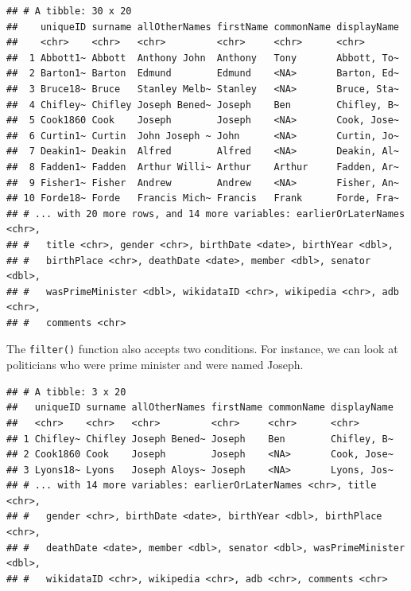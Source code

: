 \documentclass[
]{book}
\newenvironment{Shaded}{\begin{snugshade}}{\end{snugshade}}
\newcommand{\DecValTok}[1]{\textcolor[rgb]{0.00,0.00,0.81}{#1}}
\newcommand{\KeywordTok}[1]{\textcolor[rgb]{0.13,0.29,0.53}{\textbf{#1}}}
\newcommand{\NormalTok}[1]{#1}
\newcommand{\OperatorTok}[1]{\textcolor[rgb]{0.81,0.36,0.00}{\textbf{#1}}}
\newcommand{\StringTok}[1]{\textcolor[rgb]{0.31,0.60,0.02}{#1}}
\begin{document}
\begin{verbatim}
## # A tibble: 30 x 20
##    uniqueID surname allOtherNames firstName commonName displayName
##    <chr>    <chr>   <chr>         <chr>     <chr>      <chr>      
##  1 Abbott1~ Abbott  Anthony John  Anthony   Tony       Abbott, To~
##  2 Barton1~ Barton  Edmund        Edmund    <NA>       Barton, Ed~
##  3 Bruce18~ Bruce   Stanley Melb~ Stanley   <NA>       Bruce, Sta~
##  4 Chifley~ Chifley Joseph Bened~ Joseph    Ben        Chifley, B~
##  5 Cook1860 Cook    Joseph        Joseph    <NA>       Cook, Jose~
##  6 Curtin1~ Curtin  John Joseph ~ John      <NA>       Curtin, Jo~
##  7 Deakin1~ Deakin  Alfred        Alfred    <NA>       Deakin, Al~
##  8 Fadden1~ Fadden  Arthur Willi~ Arthur    Arthur     Fadden, Ar~
##  9 Fisher1~ Fisher  Andrew        Andrew    <NA>       Fisher, An~
## 10 Forde18~ Forde   Francis Mich~ Francis   Frank      Forde, Fra~
## # ... with 20 more rows, and 14 more variables: earlierOrLaterNames <chr>,
## #   title <chr>, gender <chr>, birthDate <date>, birthYear <dbl>,
## #   birthPlace <chr>, deathDate <date>, member <dbl>, senator <dbl>,
## #   wasPrimeMinister <dbl>, wikidataID <chr>, wikipedia <chr>, adb <chr>,
## #   comments <chr>
\end{verbatim}

The \texttt{filter()} function also accepts two conditions. For instance, we can look at politicians who were prime minister and were named Joseph.

\begin{Shaded}
\end{Shaded}

\begin{verbatim}
## # A tibble: 3 x 20
##   uniqueID surname allOtherNames firstName commonName displayName
##   <chr>    <chr>   <chr>         <chr>     <chr>      <chr>      
## 1 Chifley~ Chifley Joseph Bened~ Joseph    Ben        Chifley, B~
## 2 Cook1860 Cook    Joseph        Joseph    <NA>       Cook, Jose~
## 3 Lyons18~ Lyons   Joseph Aloys~ Joseph    <NA>       Lyons, Jos~
## # ... with 14 more variables: earlierOrLaterNames <chr>, title <chr>,
## #   gender <chr>, birthDate <date>, birthYear <dbl>, birthPlace <chr>,
## #   deathDate <date>, member <dbl>, senator <dbl>, wasPrimeMinister <dbl>,
## #   wikidataID <chr>, wikipedia <chr>, adb <chr>, comments <chr>
\end{verbatim}
\end{document}
